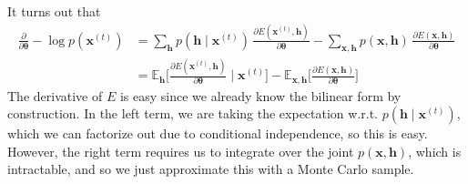     \begin{theorem}
      It turns out that
      \begin{align*} 
      \frac{\partial}{\partial \boldsymbol{\theta}} - \log p(\mathbf{x}^{(t)}) & = \sum_{\mathbf{h}}  p(\mathbf{h} \mid \mathbf{x}^{(t)}) \, \frac{ \partial E(\mathbf{x}^{(t)}, \mathbf{h})}{\partial \boldsymbol{\theta}} - \sum_{\mathbf{x}, \mathbf{h}} p(\mathbf{x}, \mathbf{h}) \, \frac{\partial E(\mathbf{x}, \mathbf{h})}{\partial \boldsymbol{\theta}} \\
                                                                               & = \mathbb{E}_{\mathbf{h}} \bigg[ \frac{\partial E( \mathbf{x}^{(t)}, \mathbf{h})}{\partial \boldsymbol{\theta}} \; \bigg| \; \mathbf{x}^{(t)} \bigg] - \mathbb{E}_{\mathbf{x}, \mathbf{h}} \bigg[ \frac{\partial E(\mathbf{x}, \mathbf{h})}{\partial \boldsymbol{\theta}} \bigg]  
      \end{align*}
      The derivative of $E$ is easy since we already know the bilinear form by construction. In the left term, we are taking the expectation w.r.t. $p(\mathbf{h} \mid \mathbf{x}^{(t)})$, which we can factorize out due to conditional independence, so this is easy. However, the right term requires us to integrate over the joint $p(\mathbf{x}, \mathbf{h})$, which is intractable, and so we just approximate this with a Monte Carlo sample. 
    \end{theorem}

